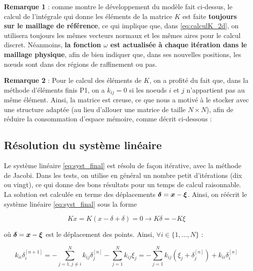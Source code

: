 \indent \textbf{Remarque 1} : comme montre le développement du modèle fait ci-dessus, le calcul de l'intégrale qui donne les éléments de la matrice \(K\) est faite \textbf{toujours sur le maillage de référence}, ce qui implique que, dans \eqref{eq:calculK_2d}, on utilisera toujours les mêmes vecteurs normaux et les mêmes aires pour le calcul discret. Néanmoins, \textbf{la fonction \(\omega\) est actualisée à chaque itération dans le maillage physique}, afin de bien indiquer que, dans ses nouvelles positions, les nœuds sont dans des régions de raffinement ou pas.

\indent

\indent \textbf{Remarque 2} : Pour le calcul des éléments de \(K\), on a profité du fait que, dans la méthode d'éléments finis P1, on a \(k_{ij} = 0\) si les noeuds \(i\) et \(j\) n'appartient pas au même élément. Ainsi, la matrice est creuse, ce que nous a motivé à le stocker avec une structure adaptée (au lieu d'allouer une matrice de taille \(N \times N\)), afin de réduire la consommation d'espace mémoire, comme décrit ci-dessous : 




\subsection{Résolution du système linéaire}
\label{subsec:jacobi}

\indent Le système linéaire \eqref{eq:syst_final} est résolu de façon itérative, avec la méthode de Jacobi. Dans les tests, on utilise en général un nombre petit d'itérations (dix ou vingt), ce qui donne des bons résultats pour un temps de calcul raisonnable. La solution est calculée en terme des déplacements \(\boldsymbol{\delta} = \boldsymbol{x} - \boldsymbol{\xi}\). Ainsi, on réécrit le système linéaire \eqref{eq:syst_final} sous la forme 

\begin{equation*}
	Kx = K(x-\delta+\delta) = 0 \longrightarrow K\delta = -K\xi
\end{equation*}

\indent où \(\boldsymbol{\delta} = \boldsymbol{x} - \boldsymbol{\xi}\) est le déplacement des points. Ainsi, \(\forall i \in \{1,...,N\} \) :

\begin{equation*}
	k_{ii}\delta_i^{[n+1]} = -\sum_{j=1,j \neq i}^N k_{ij}\delta_{j}^{[n]} - \sum_{j=1}^N k_{ij}\xi_{j} = -\sum_{j=1}^N k_{ij}(\xi_j + \delta_{j}^{[n]}) + k_{ii}\delta_i^{[n]}
\end{equation*}

